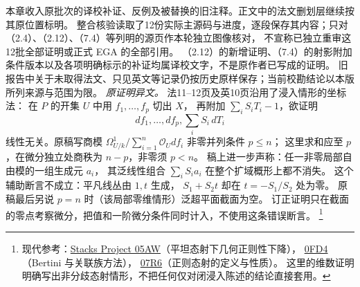 本章收入原批次的译校补证、反例及被替换的旧注释。正文中的法文删划层继续按其原位置标明。
整合核验读取了12份实际主源码与进度，逐段保存其内容；只对（2.4）、（2.12）、（7.4）等列明的源页作本轮独立图像核对，
不宣称已独立重审这12批全部证明或正式 EGA 的全部引用。
（2.12）的新增证明、（7.4）的射影附加条件版本以及各项明确标示的补证均属译校文字，不是原作者已写成的证明。
旧报告中关于未取得法文、只见英文等记录仍按历史原样保存；当前校勘结论以本版所列来源与范围为限。
\hypertarget{D18-089-notes}{}
\begingroup
\def\OO{\mathcal O}\def\FF{\mathcal F}\def\GG{\mathcal G}
\def\PP{\mathbf P}\def\calP{\mathcal P}\def\dd{\delta}
\def\Div{\operatorname{Div}}\def\depth{\operatorname{depth}}
\def\pr{\operatorname{pr}}\def\coker{\operatorname{coker}}
\noindent\emph{原证明异文。}
法11--12页及英10页沿用了浸入情形的坐标法：
在 $P$ 的开集 $U$ 中用 $f_1,\ldots,f_p$ 切出 $X$，
再附加 $\sum_iS_iT_i-1$，欲证明
\[
 df_1,\ldots,df_p,\sum_iS_i\,dT_i
\]
线性无关。原稿写商模
$\Omega^1_{U/k}/\sum_{i=1}^n\OO_Udf_i$ 非零并列条件 $p\le n$；
这里求和应至 $p$，在微分独立处商秩为 $n-p$，非零须 $p<n$。
稿上进一步声称：任一非零局部自由模的一组生成元 $a_i$，
其泛线性组合 $\sum_i S_i a_i$ 在整个扩域概形上都不消失。
这个辅助断言不成立：平凡线丛由 $1,t$ 生成，
$S_1+S_2t$ 却在 $t=-S_1/S_2$ 处为零。
原稿最后另说 $p=n$ 时（该局部零维情形）泛超平面截面为空。
订正证明只在截面的零点考察微分，把值和一阶微分条件同时计入，不使用这条错误断言。%
\footnote{现代参考：\href{https://stacks.math.columbia.edu/tag/05AW}{Stacks Project 05AW}（平坦态射下几何正则性下降），
\href{https://stacks.math.columbia.edu/tag/0FD4}{0FD4}（Bertini 与关联族方法），
\href{https://stacks.math.columbia.edu/tag/07R6}{07R6}（正则态射的定义与性质）。
这里的维数证明明确写出非分歧态射情形，不把任何仅对闭浸入陈述的结论直接套用。}

\endgroup
